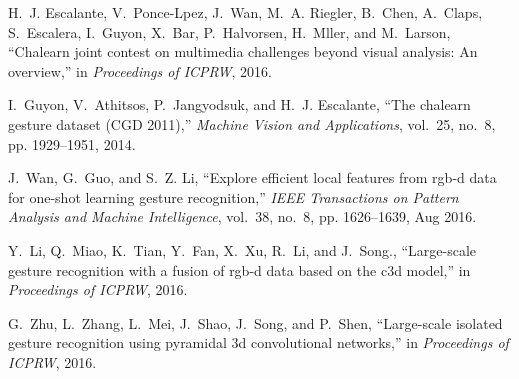 \documentclass[10pt, a4paper, conference]{IEEEtran}
\begin{document}
\begin{thebibliography}{10}
H.~J. Escalante, V.~Ponce-Lpez, J.~Wan, M.~A. Riegler, B.~Chen, A.~Claps,
  S.~Escalera, I.~Guyon, X.~Bar, P.~Halvorsen, H.~Mller, and M.~Larson,
  ``Chalearn joint contest on multimedia challenges beyond visual analysis: An
  overview,'' in \emph{Proceedings of ICPRW}, 2016.

I.~Guyon, V.~Athitsos, P.~Jangyodsuk, and H.~J. Escalante, ``The chalearn
  gesture dataset ({CGD} 2011),'' \emph{Machine Vision and Applications},
  vol.~25, no.~8, pp. 1929--1951, 2014.

J.~Wan, G.~Guo, and S.~Z. Li, ``Explore efficient local features from rgb-d
  data for one-shot learning gesture recognition,'' \emph{IEEE Transactions on
  Pattern Analysis and Machine Intelligence}, vol.~38, no.~8, pp. 1626--1639,
  Aug 2016.

Y.~Li, Q.~Miao, K.~Tian, Y.~Fan, X.~Xu, R.~Li, and J.~Song., ``Large-scale
  gesture recognition with a fusion of rgb-d data based on the c3d model,'' in
  \emph{Proceedings of ICPRW}, 2016.

G.~Zhu, L.~Zhang, L.~Mei, J.~Shao, J.~Song, and P.~Shen, ``Large-scale isolated
  gesture recognition using pyramidal 3d convolutional networks,'' in
  \emph{Proceedings of ICPRW}, 2016.

\end{thebibliography}


\end{document}
